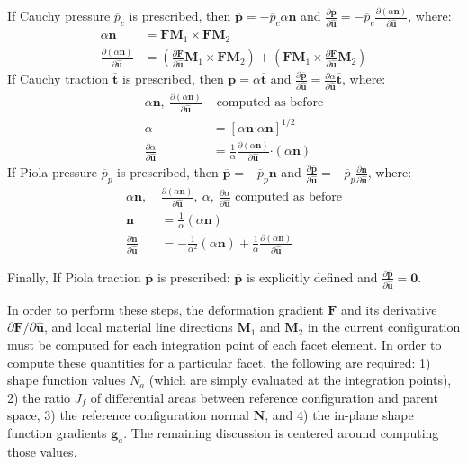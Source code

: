 If Cauchy pressure $\overline{p}_c$ is prescribed, then $\bm {\overline{p}} = {-\overline{p}_c}\alpha{\bm n}$ and $\frac{\partial \bm {\overline{p}}}{\partial \hat {\bm{u}}} = {-\overline{p}_c}\frac{\partial (\alpha {\bm n})}{\partial {\hat {\bm{u}}}}$, where:
\begin{align}
\alpha{\bm n} &= {\bm F}{\bm M}_1 \times {\bm F}{\bm M}_2 \\
\frac{\partial (\alpha{\bm n})}{\partial {\hat {\bm{u}}}} &= (\frac{\partial {\bm F}}{\partial {\hat {\bm{u}}}}{\bm M}_1 \times {\bm F}{\bm M}_2) + ({\bm F}{\bm M}_1 \times \frac{\partial {\bm F}}{\partial {\hat {\bm{u}}}}{\bm M}_2)
\end{align}
If Cauchy traction $\overline{\bm{t}}$ is prescribed, then $\bm {\overline{p}} = \alpha{\overline{\bm{t}}}$ and $\frac{\partial \bm {\overline{p}}}{\partial {\hat {\bm{u}}}} = \frac{\partial \alpha}{\partial {\hat {\bm{u}}}}{\overline{\bm{t}}}$, where:
\begin{align}
{\alpha \bm n}, \ \frac{\partial (\alpha {\bm n})}{\partial {\hat {\bm{u}}}} &\text{ computed as before} \nonumber \\
\alpha &= [\alpha {\bm n} \bm{\cdot} \alpha {\bm n}]^{1/2} \\
 \frac{\partial{\alpha}}{\partial {\hat {\bm{u}}}} &= \frac{1}{\alpha}\frac{\partial({\alpha {\bm n}})}{\partial {\hat {\bm{u}}}} \bm{\cdot} ({\alpha \bm n})
\end{align}
If Piola pressure $\overline{p}_p$ is prescribed, then $\bm{\overline{p}} = {-\overline{p}_p}{\bm n}$ and $\frac{\partial \bm {\overline{p}}}{\partial {\hat {\bm{u}}}} = {-\overline{p}_p}\frac{\partial {\bm n}}{\partial {\hat {\bm{u}}}}$, where:
\begin{align}
{\alpha \bm n}, \ &\frac{\partial (\alpha {\bm n})}{\partial {\hat {\bm{u}}}}, \ \alpha, \ \frac{\partial \alpha}{\partial {\hat {\bm{u}}}} \text{ computed as before} \nonumber \\
{\bm n} &= \frac{1}{\alpha}(\alpha {\bm n}) \\
\frac{\partial {\bm n}}{\partial {\hat {\bm{u}}}} &= -\frac{1}{\alpha^2}(\alpha {\bm n}) + \frac{1}{\alpha}\frac{\partial (\alpha{\bm n})}{\partial {\hat {\bm{u}}}}
\end{align}

Finally, If Piola traction $\bm {\overline{p}}$ is prescribed: $\bm {\overline{p}}$ is explicitly defined and $\frac{\partial \bm {\overline{p}}}{\partial {\hat {\bm{u}}}} = {\bm 0}$.

In order to perform these steps, the deformation gradient $\bm{F}$ and its derivative ${\partial \bm{F}}/{\partial \hat{\bm{u}}}$, and local material line directions $\bm{M}_1$ and $\bm{M}_2$ in the current configuration must be computed for each integration point of each facet element. In order to compute these quantities for a particular facet, the following are required: 1) shape function values $N_a$ (which are simply evaluated at the integration points), 2) the ratio $J_f$ of differential areas between reference configuration and parent space, 3) the reference configuration normal ${\bm {N}}$, and 4) the in-plane shape function gradients ${\bm {g}}_a$. The remaining discussion is centered around computing those values.

